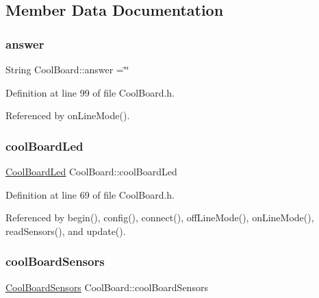 \subsection{Member Data Documentation}
\mbox{\label{classCoolBoard_a7b835fafd449e5282f7f91d787a2dc15}} 
\subsubsection{\texorpdfstring{answer}{answer}}
{\footnotesize\ttfamily String Cool\+Board\+::answer =\char`\"{}\char`\"{}\hspace{0.3cm}{\ttfamily [private]}}



Definition at line 99 of file Cool\+Board.\+h.



Referenced by on\+Line\+Mode().

\mbox{\label{classCoolBoard_a1b1d3c684a5baa56b08486e192fd8e97}} 
\subsubsection{\texorpdfstring{cool\+Board\+Led}{coolBoardLed}}
{\footnotesize\ttfamily \hyperlink{classCoolBoardLed}{Cool\+Board\+Led} Cool\+Board\+::cool\+Board\+Led\hspace{0.3cm}{\ttfamily [private]}}



Definition at line 69 of file Cool\+Board.\+h.



Referenced by begin(), config(), connect(), off\+Line\+Mode(), on\+Line\+Mode(), read\+Sensors(), and update().

\mbox{\label{classCoolBoard_af102be5288bd7f7a8e59b13f86e26a00}} 
\subsubsection{\texorpdfstring{cool\+Board\+Sensors}{coolBoardSensors}}
{\footnotesize\ttfamily \hyperlink{classCoolBoardSensors}{Cool\+Board\+Sensors} Cool\+Board\+::cool\+Board\+Sensors\hspace{0.3cm}{\ttfamily [private]}}



